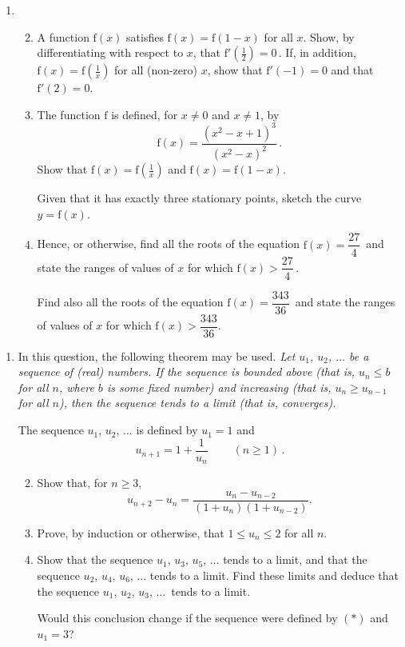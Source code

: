 \documentclass[a4, 11pt]{report}
\newlength{\qspace}
\newcounter{qnumber}
\newenvironment{question}%
 {\vspace{\qspace}
  \begin{enumerate}[\bfseries 1\quad][10]%
    \setcounter{enumi}{\value{qnumber}}%
    \item%
 }
{
  \end{enumerate}
  \filbreak
  \stepcounter{qnumber}
 }
\newenvironment{questionparts}[1][1]%
 {
  \begin{enumerate}[\bfseries (i)]%
    \setcounter{enumii}{#1}
    \addtocounter{enumii}{-1}
    \setlength{\itemsep}{5mm}
    \setlength{\parskip}{8pt}
 }
 {
  \end{enumerate}
 }
\def\f{{\mathrm f}}
\def\le{\leqslant}
\def\ge{\geqslant}
\begin{document}
\begin{question}
\begin{questionparts}
\item A function $\f(x)$ satisfies $\f(x) = \f(1-x)$ for all $x$.
Show, by differentiating with respect to $x$, that $\f'(\frac12) =0\,$.
If, in addition,  $\f(x) = \f(\frac1x)$ for all (non-zero) $x$, show that 
$\f'(-1)=0$ and that  $\f'(2)=0$.

\item  The function $\f$ is defined, for $x\ne0$ and $x\ne1$, by
\[
\f(x) = \frac {(x^2-x+1)^3}{(x^2-x)^2} \,. 
\]
Show that $\f(x)= \f(\frac 1 x)$ and $\f(x) = \f(1-x)$. 

Given that it has exactly three stationary points, 
sketch the 
curve  $y=\f(x)$. 

\item
Hence, or otherwise,
 find all the roots of the equation $\f(x) = \dfrac {27} 4\,$
and state the ranges of values of $x$ for which $\f(x) > \dfrac{27} 4\,$. 

 Find also all  the roots of the  equation $\f(x) = \dfrac{343}{36}\,$
and state the ranges of values of $x$ for which 
$\f(x) >   \dfrac{343}{36}$.

 \end{questionparts}
	\end{question}
	
\begin{question}
In this question, the following theorem may be used.\newline 
{\sl Let $u_1$, $u_2$, $\ldots$ be a sequence of (real) numbers. 
If the sequence is bounded above (that is, $u_n\le b$ for all $n$, where $b$
is some  fixed number) and increasing 
(that is, $u_n\ge u_{n-1}$ for all $n$), then
the sequence tends to a limit (that is, converges).}

The sequence  $u_1$, $u_2$, $\ldots$ is defined by $u_1=1$ and 
\[
u_{n+1} = 1+\frac 1{u_n} \ \ \ \ \ \ \ \ \ \ (n\ge1)\,.
\tag{$*$}
\]


\begin{questionparts}
\item Show that, for $n\ge3$, 
\[
u_{n+2}-u_n = \frac{u_{n} - u_{n-2}}{(1+u_n)(1+u_{n-2})}
.
\]
\item Prove, by induction or otherwise, that $1\le u_n \le 2$ for all $n$.
\item 
Show that the sequence $u_1$, $u_3$, $u_5$, $\ldots$
tends to a limit, 
and that the sequence $u_2$, $u_4$, $u_6$, $\ldots$
tends to a limit. Find these limits and  deduce that the sequence 
 $u_1$, $u_2$, $u_3$, $\ldots\,$ tends to a limit.

Would this conclusion change if the sequence were 
defined by $(*)$ and $u_1=3$? 
\end{questionparts}
\end{question}
	
\end{document}
